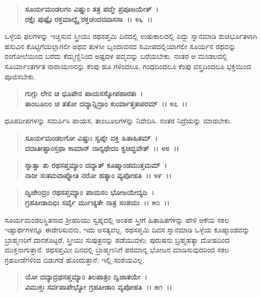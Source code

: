 \begin{verse}
\textbf{ಸೂರ್ಯಮಂಡಲಗಂ ವಿಷ್ಣುಂ ತತ್ರ ಪದ್ಮೇ ಪ್ರಪೂಜಯೇತ್~।}\\\textbf{ರಕ್ತೈಃ ಪುಷ್ಪೈಃ ರಕ್ತಮಾಲ್ಯೈ ರಕ್ತಚಂದನವಾಸಸಾ~।। ೪೬~।।}
\end{verse}

ಒಳ್ಳೆಯ ಫಲಗಳನ್ನು ಇಚ್ಚಿಸುವ ಸ್ತ್ರೀಯು ರಥಸಪ್ತಮಿ ದಿನದಲ್ಲಿ ಉಷಃಕಾಲದಲ್ಲಿ ಎದ್ದು ಸ್ನಾನಮಾಡಿ ಶುಚಿರ್ಭೂತಳಾಗಿ ಹಸುವಿನ ಕೊಟ್ಟಿಗೆಯಲ್ಲಾಗಲೀ ಅಥವ ತುಳಸೀ ಬೃಂದಾವನದ ಸಮೀಪದಲ್ಲಿಯಾಗಲೀ ಸೂರ್ಯನ ರಥವನ್ನು ರಂಗೋಲೆಯಿಂದ ಬರೆದು ಕೆಮ್ಮಣ್ಣಿನಿಂದ ಅಷ್ಟದಳ ಪದ್ಮವನ್ನು ಬರೆಯಬೇಕು. ನಂತರ ಆ ಮಂಡಲದಲ್ಲಿ ಸೂರ್ಯಾಂತರ್ಗತ ನಾರಾಯಣನನ್ನು ಕೆಂಪು ಹೂ ಗಳಿಂದಲೂ, ಗಂಧದಿಂದಲೂ ಕೆಂಪು ವಸ್ತ್ರದಿಂದಲೂ ಭಕ್ತಿಯಿಂದ ಪೂಜಿಸಬೇಕು.

\begin{verse}
\textbf{ಗುಗ್ಗು ಲೇನ ಚ ಧೂಪೇನ ಪಾಯಸಸ್ಕೋಪಹಾರತಃ~।}\\\textbf{ತಾಂಬೂಲಂ ಚ ತತೋ ದದ್ಯಾನ್ನಿದ್ರಾಂ ಕುರ್ಯಾತ್ತತಃಪರಮ್~।। ೪೭~।।}
\end{verse}

ಧೂಪದೀಪಗಳನ್ನು ಸಮರ್ಪಿಸಿ ಪಾಯಸ, ತಾಂಬೂಲಗಳನ್ನು ನಿವೇದಿಸಿ. ನಂತರ ನಿದ್ರೆಯನ್ನು ಮಾಡಬೇಕು.

\begin{verse}
\textbf{ಸೂರ್ಯಮಂಡಲಗೋ ವಿಷ್ಣುಃ ಸ್ವಪ್ನೇ ವಕ್ತಿ ಹಿತಾಹಿತಮ್‌~।}\\\textbf{ದದಾತೀಷ್ಟಾಂಸ್ತಥಾ ಕಾಮಾನ್ ನಾನ್ಯಥೇದಂ ಕ್ವಚಿದ್ಭವೇತ್~।। ೪೮~।। }
\end{verse}

\begin{verse}
\textbf{ಸ್ನಾತ್ವಾ ತು ರಥಸಪ್ತಮ್ಯಾಂ ದದ್ಯಾತ್ ಕೂಷ್ಮಾಂಡಮುತ್ತಮಮ್~।}\\\textbf{ನಾರೀ ಸುತಮವಾಪ್ನೋತಿ ನರೋ ಹತ್ಯಾಂ ವ್ಯಪೋಹತಿ~।। ೪೯~।। }
\end{verse}

\begin{verse}
\textbf{ದ್ವಿಜೇಂದ್ರಂ ರಥಸಪ್ತಮ್ಯಾಂ ಪಾಯಸಂ ಭೋಜಯೇದ್ಯದಿ~।}\\\textbf{ಗ್ರಹಪೀಡಾದಿಭಿಃ ಸರ್ವೈ ರ್ಮುಚ್ಯತೇ ನಾತ್ರ ಸಂಶಯಃ~।। ೫೦~।।}
\end{verse}

ಸೂರ್ಯಮಂಡಲಸ್ಥಿತನಾದ ಶ‍್ರೀಹರಿಯು ಸ್ವಪ್ನದಲ್ಲಿ ಅಂತಹ ಸ್ತ್ರೀಗೆ ಹಿತಾಹಿತಗಳನ್ನು ಹೇಳಿ ಆಕೆಯ ಸಕಲ ಇಷ್ಟಾರ್ಥಗಳನ್ನೂ ಈಡೇರಿಸುವನು, ಇದು ಅಸತ್ಯವಲ್ಲ. ರಥಸಪ್ತಮಿ ದಿವಸ ಸ್ನಾನಮಾಡಿ ಒಳ್ಳೆಯ ಕೂಷ್ಮಾಂಡವನ್ನು ಬ್ರಾಹ್ಮಣರಿಗೆ ದಾನಕೊಟ್ಟರೆ, ಸ್ತ್ರೀಯು ಸುಪುತ್ರನನ್ನು ಪಡೆಯುವಳು; ಪುರುಷನು ಬ್ರಹ್ಮಹತ್ಯಾ ದೋಷದಿಂದ ಮುಕ್ತನಾಗುತ್ತಾನೆ. ರಥಸಪ್ತಮೀ ದಿನದಲ್ಲಿ ಬ್ರಾಹ್ಮಣನಿಗೆ ಪರಮಾನ್ನ ಭೋಜನ ಮಾಡಿಸುವುದರಿಂದ ಸಕಲ ಗ್ರಹಪೀಡೆಗಳಿಂದ ಬಿಡುಗಡೆ ಹೊಂದುತ್ತಾನೆ; ಇಲ್ಲಿ ಸಂಶಯವಿಲ್ಲ.

\begin{verse}
\textbf{ಯೋ ದದ್ಯಾದ್ರಥಸಪ್ತಮ್ಯಾಂ ತಿಲಪಾತ್ರಂ ದ್ವಿಜಾತಯೇ~।}\\\textbf{ವಿಮುಕ್ತಃ ಸರ್ವಪಾಪೇಭ್ಯೋ ಗ್ರಹಪೀಡಾಂ ವ್ಯಪೋಹತಿ~।। ೫೧~।।}
\end{verse}

